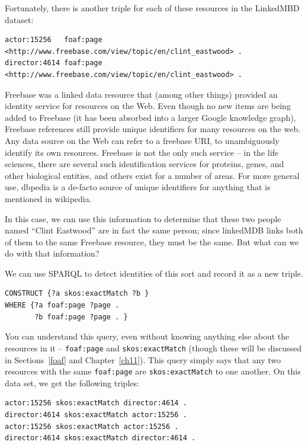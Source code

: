 \begin{challenge}
Fortunately, there is another triple for each of these resources in the
LinkedMBD dataset:

\begin{lstlisting}
actor:15256   foaf:page  <http://www.freebase.com/view/topic/en/clint_eastwood> .
director:4614 foaf:page  <http://www.freebase.com/view/topic/en/clint_eastwood> .

\end{lstlisting}

Freebase was a linked data resource that (among other things) provided an
identity service for resources on the Web. Even though no new items are being added to Freebase
(it has been absorbed into a larger Google knowledge graph), Freebase references still provide unique
identifiers for many resources on the web. 
Any data source on the Web
can refer to a freebase URI, to unambiguously identify its own
resources. Freebase is not the only such service -- in the life
sciences, there are several such identification services for proteins,
genes, and other biological entities, and others exist for a number of
areas.  For more general use, dbpedia is a de-facto source of unique identifiers for anything that
is mentioned in wikipedia. 

In this case, we can use this information to determine that these two
people named ``Clint Eastwood'' are in fact the same person; since
linkedMDB links both of them to the same Freebase resource, they must be
the same. But what can we do with that information?

We can use SPARQL to detect identities of this sort and record it as a
new triple.

\begin{lstlisting}
CONSTRUCT {?a skos:exactMatch ?b }
WHERE {?a foaf:page ?page .
       ?b foaf:page ?page . }
\end{lstlisting}

You can understand this query, even without knowing anything else about
the resources in it -- \texttt{foaf:page} and \texttt{skos:exactMatch} (though these will
be discussed in Sections~\ref{foaf} and Chapter~\ref{ch11}). This query simply says that any two
resources with the same \texttt{foaf:page} are \texttt{skos:exactMatch} to one another. On
this data set, we get the following triples:

\begin{lstlisting}
actor:15256 skos:exactMatch director:4614 .
director:4614 skos:exactMatch actor:15256 .
actor:15256 skos:exactMatch actor:15256 .
director:4614 skos:exactMatch director:4614 .
\end{lstlisting}


\end{challenge}
